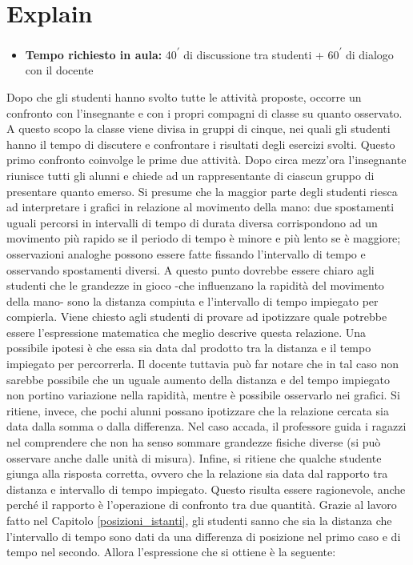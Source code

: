 \documentclass{report} \usepackage[T1]{fontenc} \usepackage[italian]{babel}
\begin{document}
\section{Explain}\label{velocità_explain}

\begin{itemize}
\item \textbf{Tempo richiesto in aula:} 40\textsuperscript{$\prime$} di discussione tra studenti
      + 60\textsuperscript{$\prime$} di dialogo con il docente
\end{itemize}

Dopo che gli studenti hanno svolto tutte le attività proposte, occorre un
confronto con l’insegnante e con i propri compagni di classe su quanto
osservato. A questo scopo la classe viene divisa in gruppi di cinque, nei quali gli
studenti hanno il tempo di discutere e confrontare i risultati degli esercizi
svolti. Questo primo confronto coinvolge le prime due attività. Dopo
circa mezz’ora l’insegnante riunisce tutti gli alunni e chiede ad un
rappresentante di ciascun gruppo di presentare quanto emerso.
Si presume che la maggior parte degli studenti riesca ad interpretare i
grafici in relazione al movimento della mano: due spostamenti uguali percorsi
in intervalli di tempo di durata diversa corrispondono ad un movimento più
rapido se il periodo di tempo è minore e più lento se è maggiore; osservazioni
analoghe possono essere fatte fissando l’intervallo di tempo e osservando
spostamenti diversi.
A questo punto dovrebbe essere chiaro agli studenti che le grandezze in gioco
-che influenzano la rapidità del movimento della mano- sono la distanza compiuta
e l’intervallo di tempo impiegato per compierla. Viene chiesto
agli studenti di provare ad ipotizzare quale potrebbe essere l’espressione
matematica che meglio descrive questa relazione. Una possibile ipotesi è che
essa sia data dal prodotto tra la distanza e il tempo impiegato per
percorrerla. Il docente tuttavia può far notare che in tal caso non sarebbe
possibile che un uguale aumento della distanza e del tempo impiegato non portino
variazione nella rapidità, mentre è possibile osservarlo nei grafici. Si
ritiene, invece, che pochi alunni possano ipotizzare che la relazione cercata
sia data dalla somma o dalla differenza. Nel caso accada, il professore guida i
ragazzi nel comprendere che non ha senso  sommare grandezze fisiche diverse
(si può osservare anche dalle unità di misura). Infine, si
ritiene che qualche studente giunga alla risposta corretta, ovvero che la
relazione sia data dal rapporto tra distanza e intervallo di tempo impiegato.
Questo risulta essere ragionevole, anche perché il rapporto è l'operazione
di confronto tra due quantità.
Grazie al lavoro fatto nel Capitolo \ref{posizioni_istanti}, gli studenti sanno
che sia la  distanza che l’intervallo di tempo sono dati da una differenza
di posizione nel  primo caso e di tempo nel secondo. Allora l’espressione
che si ottiene è la seguente:
\end{document}
